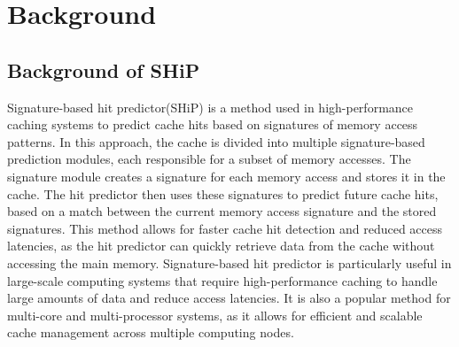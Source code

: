 
\section{Background}
\subsection{Background of SHiP}
Signature-based hit predictor(SHiP) is a method used in high-performance caching systems to predict cache hits based on signatures of memory access patterns. In this approach, the cache is divided into multiple signature-based prediction modules, each responsible for a subset of memory accesses. The signature module creates a signature for each memory access and stores it in the cache. The hit predictor then uses these signatures to predict future cache hits, based on a match between the current memory access signature and the stored signatures. This method allows for faster cache hit detection and reduced access latencies, as the hit predictor can quickly retrieve data from the cache without accessing the main memory\cite{llc}. Signature-based hit predictor is particularly useful in large-scale computing systems that require high-performance caching to handle large amounts of data and reduce access latencies. It is also a popular method for multi-core and multi-processor systems, as it allows for efficient and scalable cache management across multiple computing nodes\cite{Jinchun,Elvira}.

